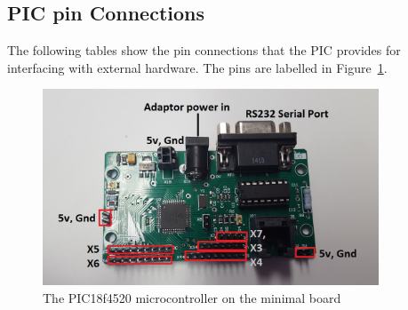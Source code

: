 \documentclass[11pt,a4paper]{article}
\begin{document}
\subsection{PIC pin Connections}
  \label{appA:PIC pin Connections}
  The following tables show the pin connections that the PIC provides for interfacing with external hardware. The pins are labelled in Figure~\ref{fig:PIC}.
  \begin{figure}
      \includegraphics[width=10cm]{pic.png}
      \caption{The PIC18f4520 microcontroller on the minimal board}
      \label{fig:PIC}
  \end{figure}
\end{document}
